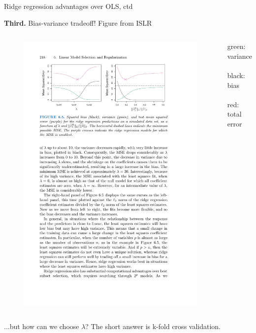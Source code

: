 \documentclass[mathserif, aspectratio=169]{beamer}
\begin{document}
\begin{frame}{Ridge regression advantages over OLS, ctd}

\textbf{Third.}  Bias-variance tradeoff! {\tiny Figure from ISLR}

\begin{columns}
\begin{figure}
\includegraphics[scale=1.1]{bias-variance-ridge}
\end{figure}


green: variance\\~\\
black: bias\\~\\
red: total error

\end{columns}

...but how can we choose $\lambda$?  The short answer is k-fold cross validation.

\end{frame}
\end{document}
